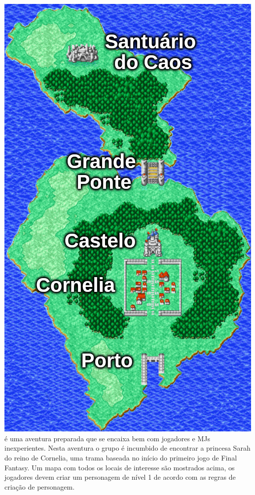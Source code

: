 %
\\\\
%
\includegraphics[width=\columnwidth]{./art/chaosincornelia/map.jpg} \ofpar
%
 é uma aventura preparada que se encaixa bem com jogadores e MJs inexperientes. 
Nesta aventura o grupo é incumbido de encontrar a princesa Sarah do reino de Cornelia, uma trama baseada no início do primeiro jogo de Final Fantasy.
Um mapa com todos os locais de interesse são mostrados acima, os jogadores devem criar um personagem de nível 1 de acordo com as regras de criação de personagem. 
